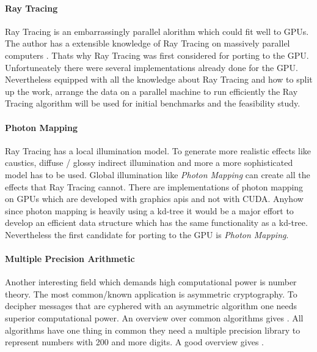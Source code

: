 \paragraph{Ray Tracing} %
\label{par:ray_tracing}
Ray Tracing \citep{citeulike:841961} is an embarrassingly parallel alorithm which
could fit well to GPUs. The author has a extensible knowledge of Ray Tracing on
massively parallel computers \citep{citeulike:80546}. Thats why Ray Tracing was
first considered for porting to the GPU. Unfortuneately there were several
implementations already done for the GPU. Nevertheless equipped with all the
knowledge about Ray Tracing and how to split up the work, arrange the data on a
parallel machine to run efficiently the Ray Tracing algorithm
\citep{citeulike:3770900} will be used for initial benchmarks and the feasibility
study.

\paragraph{Photon Mapping} %
\label{par:photon_mapping}
Ray Tracing has a local illumination model. To generate more realistic effects
like caustics, diffuse / glossy indirect illumination and more a more
sophisticated model has to be used. Global illumination like \emph{Photon
Mapping} \citep{citeulike:635695} can create all the effects that Ray Tracing
cannot. There are implementations of photon mapping on GPUs
\citep{Purcell:2003:PMO} which are developed with graphics apis and not with
CUDA. Anyhow since photon mapping is heavily using a kd-tree it would be a major
effort to develop an efficient data structure which has the same functionality
as a kd-tree. Nevertheless the first candidate for porting to the \gls{GPU} is \emph{Photon Mapping}.

\paragraph{Multiple Precision Arithmetic} %
\label{par:multiple_precision_arithmetic}
Another interesting field which demands high computational power is number
theory. The most common/known application is asymmetric cryptography. To
decipher messages that are cyphered with an asymmetric algorithm one needs
superior computational power. An overview over common algorithms gives
\citep{citeulike:3783254}. All algorithms have one thing in common they need a
multiple precision library to represent numbers with 200 and more digits. A good
overview gives \citep{citeulike:3783244}.

